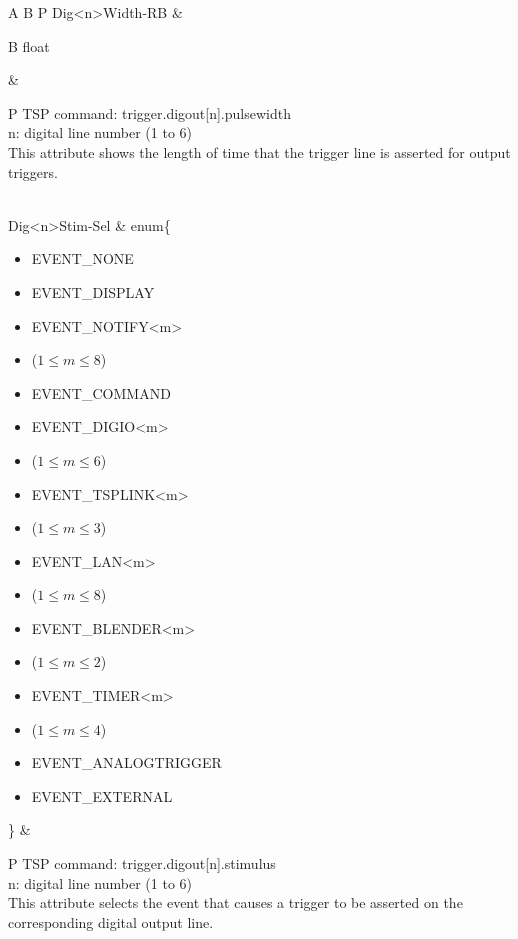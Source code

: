 \documentclass[openany]{article}
\begin{document}
\begin{longtable}{A B P}
		Dig{\textless n\textgreater}Width-RB & \begin{tabular}{B}
					float
				\end{tabular} & 
				\begin{tabular}{P}
					TSP command: trigger.digout[n].pulsewidth \\
					n: digital line number (1 to 6) \\
					This attribute shows the length of time that the trigger line is asserted for output triggers.
				\end{tabular} \\ \hline
		Dig{\textless n\textgreater}Stim-Sel & enum\{\begin{itemize}[noitemsep]
					\small
					\item[] EVENT\_NONE
					\item[] EVENT\_DISPLAY
					\item[] EVENT\_NOTIFY\textless m\textgreater
					\item[] ($1\leq m\leq 8$)
					\item[] EVENT\_COMMAND
					\item[] EVENT\_DIGIO\textless m\textgreater
					\item[] ($1\leq m\leq 6$)
					\item[] EVENT\_TSPLINK\textless m\textgreater
					\item[] ($1\leq m\leq 3$)
					\item[] EVENT\_LAN\textless m\textgreater
					\item[] ($1\leq m\leq 8$)
					\item[] EVENT\_BLENDER\textless m\textgreater 
					\item[] ($1\leq m\leq 2$)
					\item[] EVENT\_TIMER\textless m\textgreater
					\item[] ($1\leq m\leq 4$)
					\item[] EVENT\_ANALOGTRIGGER
					\item[] EVENT\_EXTERNAL
				\end{itemize}\} & 
				\begin{tabular}{P}
					TSP command: trigger.digout[n].stimulus \\
					n: digital line number (1 to 6) \\
					This attribute selects the event that causes a trigger to be asserted on the corresponding digital output line.
				\end{tabular} \\


\end{longtable}
\end{document}
